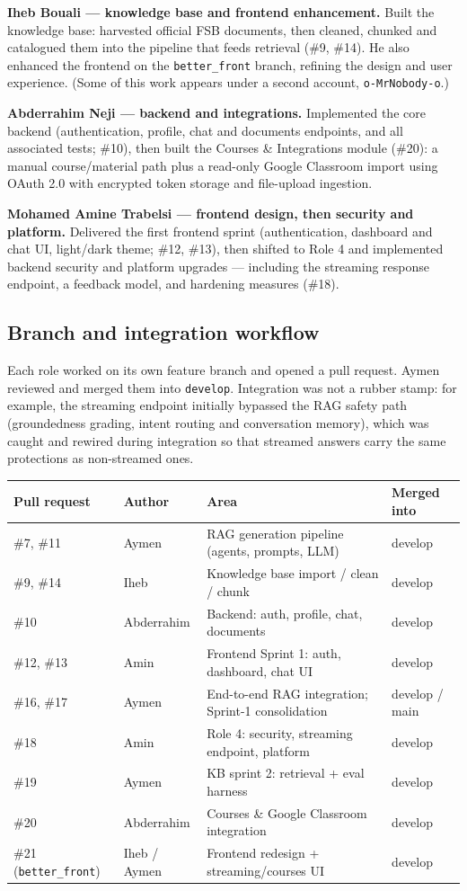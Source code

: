 \documentclass[11pt,a4paper]{article}
\begin{document}
\textbf{Iheb Bouali --- knowledge base and frontend enhancement.} Built the knowledge base: harvested official FSB documents, then cleaned, chunked and catalogued them into the pipeline that feeds retrieval (\#9, \#14). He also enhanced the frontend on the \texttt{better\_front} branch, refining the design and user experience. (Some of this work appears under a second account, \texttt{o-MrNobody-o}.)

\textbf{Abderrahim Neji --- backend and integrations.} Implemented the core backend (authentication, profile, chat and documents endpoints, and all associated tests; \#10), then built the Courses \& Integrations module (\#20): a manual course/material path plus a read-only Google Classroom import using OAuth 2.0 with encrypted token storage and file-upload ingestion.

\textbf{Mohamed Amine Trabelsi --- frontend design, then security and platform.} Delivered the first frontend sprint (authentication, dashboard and chat UI, light/dark theme; \#12, \#13), then shifted to Role 4 and implemented backend security and platform upgrades --- including the streaming response endpoint, a feedback model, and hardening measures (\#18).

\subsection{Branch and integration workflow}
Each role worked on its own feature branch and opened a pull request. Aymen reviewed and merged them into \texttt{develop}. Integration was not a rubber stamp: for example, the streaming endpoint initially bypassed the RAG safety path (groundedness grading, intent routing and conversation memory), which was caught and rewired during integration so that streamed answers carry the same protections as non-streamed ones.

\begin{tabularx}{\textwidth}{@{}p{2.9cm} p{2.2cm} Y p{2.6cm}@{}}
\toprule
\textbf{Pull request} & \textbf{Author} & \textbf{Area} & \textbf{Merged into}\\
\midrule
\#7, \#11 & Aymen & RAG generation pipeline (agents, prompts, LLM) & develop\\
\#9, \#14 & Iheb & Knowledge base import / clean / chunk & develop\\
\#10 & Abderrahim & Backend: auth, profile, chat, documents & develop\\
\#12, \#13 & Amin & Frontend Sprint 1: auth, dashboard, chat UI & develop\\
\#16, \#17 & Aymen & End-to-end RAG integration; Sprint-1 consolidation & develop / main\\
\#18 & Amin & Role 4: security, streaming endpoint, platform & develop\\
\#19 & Aymen & KB sprint 2: retrieval + eval harness & develop\\
\#20 & Abderrahim & Courses \& Google Classroom integration & develop\\
\#21 (\texttt{better\_front}) & Iheb / Aymen & Frontend redesign + streaming/courses UI & develop\\
\bottomrule
\end{tabularx}
\end{document}
